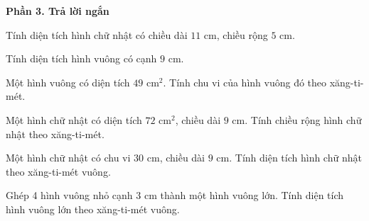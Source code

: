 \textbf{Phần 3. Trả lời ngắn}

\begin{ex} %
Tính diện tích hình chữ nhật có chiều dài $11\text{ cm}$, chiều rộng $5\text{ cm}$.
\end{ex}

\begin{ex} %
Tính diện tích hình vuông có cạnh $9\text{ cm}$.
\end{ex}

\begin{ex} %
Một hình vuông có diện tích $49\text{ cm}^2$. Tính chu vi của hình vuông đó theo xăng-ti-mét.
\end{ex}

\begin{ex} %
Một hình chữ nhật có diện tích $72\text{ cm}^2$, chiều dài $9\text{ cm}$. Tính chiều rộng hình chữ nhật theo xăng-ti-mét.
\end{ex}

\begin{ex} %
Một hình chữ nhật có chu vi $30\text{ cm}$, chiều dài $9\text{ cm}$. Tính diện tích hình chữ nhật theo xăng-ti-mét vuông.
\end{ex}

\begin{ex} %
Ghép 4 hình vuông nhỏ cạnh $3\text{ cm}$ thành một hình vuông lớn. Tính diện tích hình vuông lớn theo xăng-ti-mét vuông.
\end{ex}
